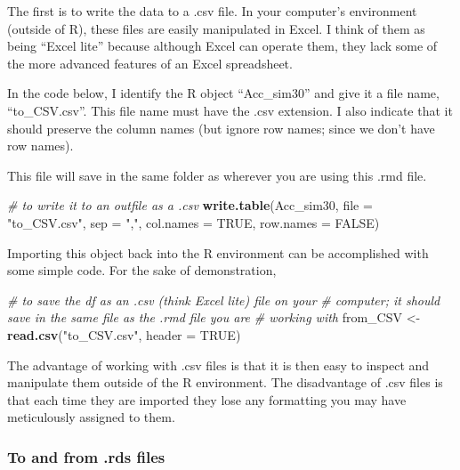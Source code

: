 \documentclass[
  11pt,
]{book}
\newenvironment{Shaded}{\begin{snugshade}}{\end{snugshade}}
\newcommand{\AttributeTok}[1]{\textcolor[rgb]{0.27,0.27,0.27}{#1}}
\newcommand{\CommentTok}[1]{\textcolor[rgb]{0.37,0.37,0.37}{\textit{#1}}}
\newcommand{\ConstantTok}[1]{\textcolor[rgb]{0.37,0.37,0.37}{#1}}
\newcommand{\FunctionTok}[1]{\textcolor[rgb]{0.27,0.27,0.27}{\textbf{#1}}}
\newcommand{\NormalTok}[1]{#1}
\newcommand{\OtherTok}[1]{\textcolor[rgb]{0.37,0.37,0.37}{#1}}
\newcommand{\StringTok}[1]{\textcolor[rgb]{0.5,0.5,0.5}{#1}}
\begin{document}
The first is to write the data to a .csv file. In your computer's environment (outside of R), these files are easily manipulated in Excel. I think of them as being ``Excel lite'' because although Excel can operate them, they lack some of the more advanced features of an Excel spreadsheet.

In the code below, I identify the R object ``Acc\_sim30'' and give it a file name, ``to\_CSV.csv''. This file name must have the .csv extension. I also indicate that it should preserve the column names (but ignore row names; since we don't have row names).

This file will save in the same folder as wherever you are using this .rmd file.

\begin{Shaded}
\begin{Highlighting}[]
\CommentTok{\# to write it to an outfile as a .csv}
\FunctionTok{write.table}\NormalTok{(Acc\_sim30, }\AttributeTok{file =} \StringTok{"to\_CSV.csv"}\NormalTok{, }\AttributeTok{sep =} \StringTok{","}\NormalTok{, }\AttributeTok{col.names =} \ConstantTok{TRUE}\NormalTok{,}
    \AttributeTok{row.names =} \ConstantTok{FALSE}\NormalTok{)}
\end{Highlighting}
\end{Shaded}

Importing this object back into the R environment can be accomplished with some simple code. For the sake of demonstration,

\begin{Shaded}
\begin{Highlighting}[]
\CommentTok{\# to save the df as an .csv (think \textquotesingle{}Excel lite\textquotesingle{}) file on your}
\CommentTok{\# computer; it should save in the same file as the .rmd file you are}
\CommentTok{\# working with}
\NormalTok{from\_CSV }\OtherTok{\textless{}{-}} \FunctionTok{read.csv}\NormalTok{(}\StringTok{"to\_CSV.csv"}\NormalTok{, }\AttributeTok{header =} \ConstantTok{TRUE}\NormalTok{)}
\end{Highlighting}
\end{Shaded}

The advantage of working with .csv files is that it is then easy to inspect and manipulate them outside of the R environment. The disadvantage of .csv files is that each time they are imported they lose any formatting you may have meticulously assigned to them.

\hypertarget{to-and-from-.rds-files}{%
\subsubsection{To and from .rds files}\label{to-and-from-.rds-files}}
\end{document}
